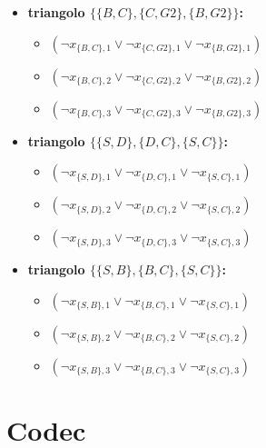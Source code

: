 \documentclass[10pt]{article}
\begin{document}
\begin{itemize}
    \item \textbf{triangolo $\{\{B, C\}, \{C, G2\}, \{B, G2\}\}$:}
    \begin{itemize}
        \item $(\neg x_{\{B, C\},1} \lor \neg x_{\{C, G2\},1} \lor \neg x_{\{B, G2\},1})$
        \item $(\neg x_{\{B, C\},2} \lor \neg x_{\{C, G2\},2} \lor \neg x_{\{B, G2\},2})$
        \item $(\neg x_{\{B, C\},3} \lor \neg x_{\{C, G2\},3} \lor \neg x_{\{B, G2\},3})$
    \end{itemize}

    \item \textbf{triangolo $\{\{S, D\}, \{D, C\}, \{S, C\}\}$:}
    \begin{itemize}
        \item $(\neg x_{\{S, D\},1} \lor \neg x_{\{D, C\},1} \lor \neg x_{\{S, C\},1})$
        \item $(\neg x_{\{S, D\},2} \lor \neg x_{\{D, C\},2} \lor \neg x_{\{S, C\},2})$
        \item $(\neg x_{\{S, D\},3} \lor \neg x_{\{D, C\},3} \lor \neg x_{\{S, C\},3})$
    \end{itemize}

    \item \textbf{triangolo $\{\{S, B\}, \{B, C\}, \{S, C\}\}$:}
    \begin{itemize}
        \item $(\neg x_{\{S, B\},1} \lor \neg x_{\{B, C\},1} \lor \neg x_{\{S, C\},1})$
        \item $(\neg x_{\{S, B\},2} \lor \neg x_{\{B, C\},2} \lor \neg x_{\{S, C\},2})$
        \item $(\neg x_{\{S, B\},3} \lor \neg x_{\{B, C\},3} \lor \neg x_{\{S, C\},3})$
    \end{itemize}
\end{itemize}


\section{Codec}
\end{document}
